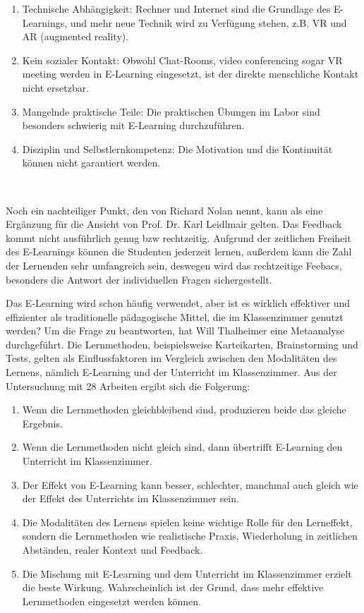 \begin{enumerate}
\item Technische Abhängigkeit: Rechner und Internet sind die Grundlage des E-Learnings, und mehr neue Technik wird zu Verfügung stehen, z.B. VR und AR (augmented reality).
\item Kein sozialer Kontakt: Obwohl Chat-Rooms, video conferencing sogar VR meeting werden in E-Learning eingesetzt, ist der direkte menschliche Kontakt nicht ersetzbar.
\item Mangelnde praktische Teile: Die praktischen Übungen im Labor sind besonders schwierig mit E-Learning durchzuführen.
\item Disziplin und Selbstlernkompetenz: Die Motivation und die Kontinuität können nicht garantiert werden.
\end{enumerate}\

Noch ein nachteiliger Punkt, den von Richard Nolan\citep{5} nennt, kann als eine Ergänzung für die Ansicht von Prof. Dr. Karl Leidlmair gelten. Das Feedback kommt nicht ausführlich genug bzw rechtzeitig. Aufgrund der zeitlichen Freiheit des E-Learnings können die Studenten jederzeit lernen, außerdem kann die Zahl der Lernenden sehr umfangreich sein, deswegen wird das rechtzeitige Feebacs, besonders die Antwort der individuellen Fragen sichergestellt.

Das E-Learning wird schon häufig verwendet, aber ist es wirklich effektiver und effizienter als traditionelle pädagogische Mittel, die im Klassenzimmer genutzt werden? Um die Frage zu beantworten, hat Will Thalheimer\citep{8} eine Metaanalyse durchgeführt. Die Lernmethoden, beispielsweise Karteikarten, Brainstorming und Tests, gelten als Einflussfaktoren im Vergleich zwischen den Modalitäten des Lernens, nämlich E-Learning und der Unterricht im Klassenzimmer. Aus der Untersuchung mit 28 Arbeiten ergibt sich die Folgerung:

\begin{enumerate}
\item Wenn die Lernmethoden gleichbleibend sind, produzieren beide das gleiche Ergebnis.
\item Wenn die Lernmethoden nicht gleich sind, dann übertrifft E-Learning den Unterricht im Klassenzimmer.
\item Der Effekt von E-Learning kann besser, schlechter, manchmal auch gleich wie der Effekt des Unterrichts im Klassenzimmer sein.
\item Die Modalitäten des Lernens spielen keine wichtige Rolle für den Lerneffekt, sondern die Lernmethoden wie realistische Praxis, Wiederholung in zeitlichen Abständen, realer Kontext und Feedback.
\item Die Mischung mit E-Learning und dem Unterricht im Klassenzimmer erzielt die beste Wirkung. Wahrscheinlich ist der Grund, dass mehr effektive Lernmethoden eingesetzt werden können. 
\end{enumerate}\

